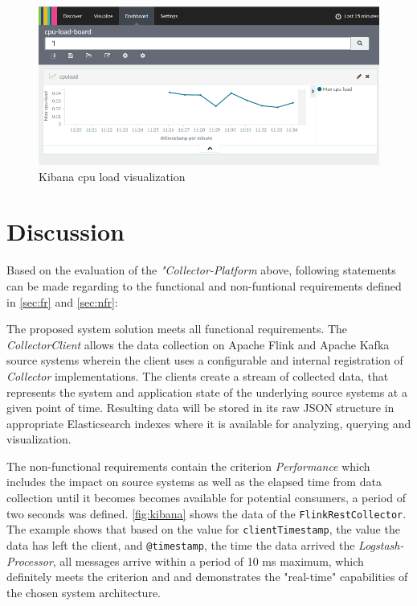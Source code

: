 \begin{figure}[H]
	\centering
	\includegraphics[width=1.0\textwidth]{../images/14-kibana-cpu.png}
	\caption{Kibana cpu load visualization}
	\label{fig:kibana-cpu}
\end{figure}

\section{Discussion}

Based on the evaluation of the \textit{"Collector-Platform} above, following statements can be made regarding to the functional and
non-funtional requirements defined in \autoref{sec:fr} and \autoref{sec:nfr}:

The proposed system solution meets all functional requirements. The \textit{CollectorClient} allows the data collection on
Apache Flink and Apache Kafka source systems wherein the client uses a configurable and internal registration of \textit{Collector} implementations.
The clients create a stream of collected data, that represents the system and application state of the underlying source systems at
a given point of time. Resulting data will be stored in its raw JSON structure in appropriate Elasticsearch indexes where it is available
for analyzing, querying and visualization.

The non-functional requirements contain the criterion \textit{Performance} which includes the impact on source systems as well as the elapsed time
from data collection until it becomes becomes available for potential consumers, a period of two seconds was defined. \autoref{fig:kibana}
shows the data of the \verb|FlinkRestCollector|. The example shows that based on the value for \verb|clientTimestamp|, the value the data has left the client,
and \verb|@timestamp|, the time the data arrived the \textit{Logstash-Processor}, all messages arrive within a period of 10 ms maximum,
which definitely meets the criterion and and demonstrates the "real-time" capabilities of the chosen system architecture.

